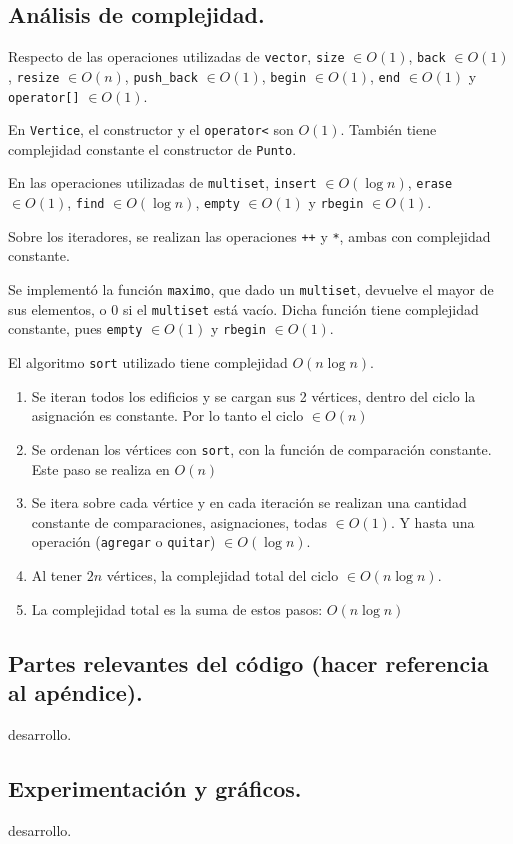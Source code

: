 \subsection{Análisis de complejidad.}

\vspace*{0.3cm}

Respecto de las operaciones utilizadas de \verb|vector|, \verb|size| $\in O(1)$,
\verb|back| $\in O(1)$, \verb|resize| $\in O(n)$, \verb|push_back| $\in O(1)$,
\verb|begin| $\in O(1)$, \verb|end| $\in O(1)$ y \verb|operator[]| $\in O(1)$.

\noindent
En \verb|Vertice|, el constructor y el \verb|operator<| son $O(1)$. También
tiene complejidad constante el constructor de \verb|Punto|.

\noindent
En las operaciones utilizadas de \verb|multiset|, \verb|insert| $\in O(\log n)$,
\verb|erase| $\in O(1)$, \verb|find| $\in O(\log n)$, \verb|empty| $\in O(1)$ y
\verb|rbegin| $\in O(1)$.

\noindent
Sobre los iteradores, se realizan las operaciones \verb|++| y \verb|*|, ambas
con complejidad constante.

\noindent
Se implementó la función \verb|maximo|, que dado un \verb|multiset|, devuelve
el mayor de sus elementos, o 0 si el \verb|multiset| está vacío. Dicha función
tiene complejidad constante, pues \verb|empty| $\in O(1)$ y \verb|rbegin| $\in O(1)$.

\noindent
El algoritmo \verb|sort| utilizado tiene complejidad $O(n \log n)$.

\noindent

\begin{enumerate}
  \item Se iteran todos los edificios y se cargan sus 2 vértices, dentro
  del ciclo la asignación es constante. Por lo tanto el ciclo $\in O(n)$

  \item Se ordenan los vértices con \verb|sort|, con la función de comparación
  constante. Este paso se realiza en $O(n)$

  \item Se itera sobre cada vértice y en cada iteración se realizan una cantidad
  constante de comparaciones, asignaciones, todas $\in O(1)$. Y hasta una operación
  (\verb|agregar| o \verb|quitar|) $\in O(\log n)$.

  \item Al tener $2n$ vértices, la complejidad total del ciclo $\in O(n \log n)$.

  \item La complejidad total es la suma de estos pasos: $O(n \log n)$
\end{enumerate}


\subsection{Partes relevantes del código (hacer referencia al apéndice).}

\vspace*{0.3cm}

desarrollo.



\subsection{Experimentación y gráficos.}

\vspace*{0.3cm}

desarrollo.
